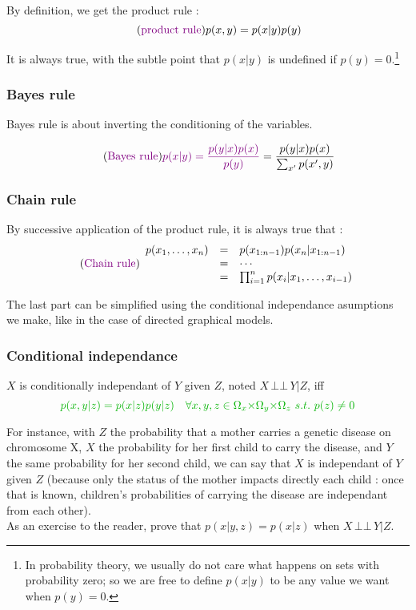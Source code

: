 \documentclass[12pt]{report}
\newcommand{\defobj}[1]{\color{red}#1\color{black}{}}
\newcommand{\defmean}[1]{\color{green!70!black}#1\color{black}{}}
\renewcommand{\emph}[1]{\color{violet}#1\color{black}{}}
\newcommand{\indep}{\ensuremath{\,\bot\!\!\!\bot\,}} %
\begin{document}
By definition, we get the product rule :
\[\tag{\emph{product rule}}
p(x,y) = p(x|y)p(y)\]

It is always true, with the subtle point that $p(x|y)$ is undefined if $p(y) = 0$.\footnote{In probability theory, we usually do not care what happens on sets with probability zero; so we are free to define $p(x|y)$ to be any value we want when $p(y)=0$.}

\subsubsection{Bayes rule}

Bayes rule is about inverting the conditioning of the variables.

\[\tag{\emph{Bayes rule}}
\emph{p(x|y) = \frac{p(y|x)p(x)}{p(y)}} = \frac{p(y|x)p(x)}{\sum_{x'}p(x',y)}
\]

\subsubsection{Chain rule}

By successive application of the product rule, it is always true that :
\[\tag{\emph{Chain rule}}
\begin{array}{r l l}
  p(x_1, \ldots, x_n) &=&p(x_{1:n-1})p(x_n|x_{1:n-1})\\
  &=& \cdots\\
  &=& \prod_{i=1}^{n} p(x_i|x_1,\ldots,x_{i-1})
\end{array}
\]

The last part can be simplified using the conditional independance
asumptions we make, like in the case of directed graphical models.

\subsubsection{Conditional independance}

\defobj{$X$ is conditionally independant of $Y$ given $Z$}, noted \defobj{$X \indep Y | Z$}, iff
\[\defmean{p(x,y|z) = p(x|z)p(y|z) \quad \medmuskip=0mu \forall x,y,z \in \Omega_x \times \Omega_y \times \Omega_z\ s.t.\ p(z) \neq 0}\]

For instance, with $Z$ the probability that a mother carries a genetic disease
on chromosome X, $X$ the probability for her first child to carry the disease,
and $Y$ the same probability for her second child, we can say that $X$ is
independant of $Y$ given $Z$ (because only the status of the mother impacts
directly each child : once that is known, children's probabilities of carrying the
disease are independant from each other).
\newline\\
As an exercise to the reader, prove that $p(x|y,z) = p(x|z)$ when $X\indep Y |Z$.
\end{document}
